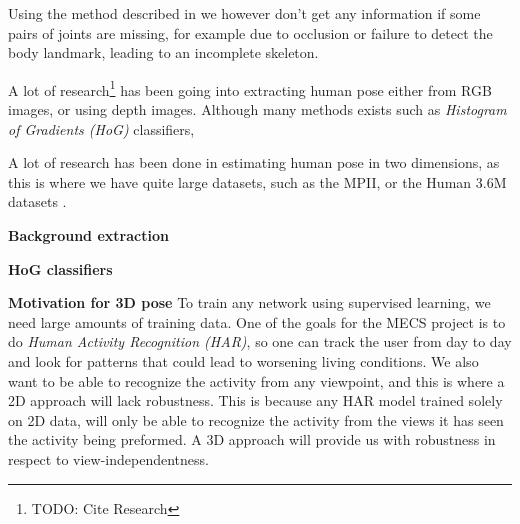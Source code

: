 Using the method described in \cite{cao2017realtime} we however don't get any information if some pairs of joints are missing, for example due to occlusion or failure to detect the body landmark, leading to an incomplete skeleton.


A lot of research\footnote{TODO: Cite Research} has been going into extracting human pose either from RGB images, or using depth images. Although many methods exists such as \emph{Histogram of Gradients (HoG)} classifiers,

A lot of research has been done in estimating human pose in two dimensions, as this is where we have quite large datasets, such as the MPII, or the Human 3.6M datasets \cite{andriluka14cvpr,h36m_pami}.

\textbf{Background extraction}

\textbf{HoG classifiers}


\textbf{Motivation for 3D pose} To train any network using supervised learning, we need large amounts of training data. One of the goals for the MECS project is to do \emph{Human Activity Recognition (HAR)}, so one can track the user from day to day and look for patterns that could lead to worsening living conditions. We also want to be able to recognize the activity from any viewpoint, and this is where a 2D approach will lack robustness. This is because any HAR model trained solely on 2D data, will only be able to recognize the activity from the views it has seen the activity being preformed. A 3D approach will provide us with robustness in respect to view-independentness.



